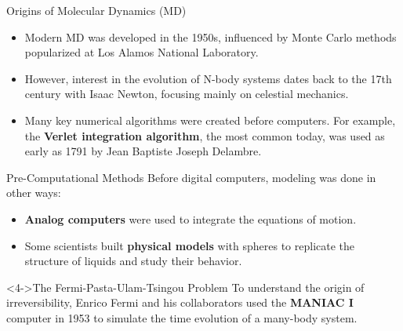 \begin{frame}{Origins of Molecular Dynamics (MD)}
    \begin{itemize}
        \item Modern MD was developed in the 1950s, influenced by Monte Carlo methods popularized at Los Alamos National Laboratory.
        \pause
        \bigskip
        \item However, interest in the evolution of N-body systems dates back to the 17th century with Isaac Newton, focusing mainly on celestial mechanics.
        \pause
        \bigskip
        \item Many key numerical algorithms were created before computers. For example, the \textbf{Verlet integration algorithm}, the most common today, was used as early as 1791 by Jean Baptiste Joseph Delambre.
    \end{itemize}
\end{frame}


\begin{frame}{Pre-Computational Methods}
    Before digital computers, modeling was done in other ways:
    \pause
    
    \begin{itemize}
        \item \textbf{Analog computers} were used to integrate the equations of motion.
        \pause
        \item Some scientists built \textbf{physical models} with spheres to replicate the structure of liquids and study their behavior.
    \end{itemize}
    \pause
    
    \begin{block}<4->{The Fermi-Pasta-Ulam-Tsingou Problem}
        To understand the origin of irreversibility, Enrico Fermi and his collaborators used the \textbf{MANIAC I} computer in 1953 to simulate the time evolution of a many-body system.
    \end{block}
\end{frame}


